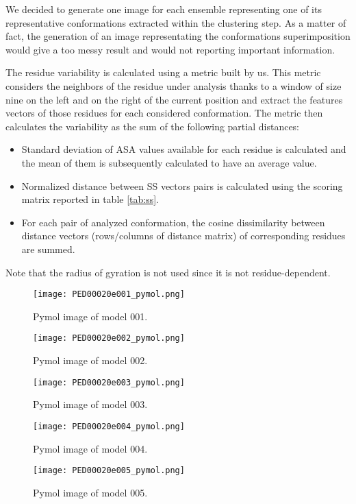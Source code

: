 We decided to generate one image for each ensemble representing one of its representative conformations extracted within the clustering step.
As a matter of fact, the generation of an image representating the conformations superimposition would give a too messy result and would not reporting important information.

\medskip
The residue variability is calculated using a metric built by us. 
This metric considers the neighbors of the residue under analysis thanks to a window of size nine on the left and on the right of the current position and extract the features vectors of those residues for each considered conformation. The metric then calculates the variability as the sum of the following partial distances:
\begin{itemize}
\item Standard deviation of ASA values available for each residue is calculated and the mean of them is subsequently calculated to have an average value.
\item Normalized distance between SS vectors pairs is calculated using the scoring matrix reported in table \ref{tab:ss}.
\item For each pair of analyzed conformation, the cosine dissimilarity between distance vectors (rows/columns of distance matrix) of corresponding residues are summed.
\end{itemize}
Note that the radius of gyration is not used since it is not residue-dependent.

\begin{figure}[H]
	\begin{minipage}[b]{0.97\textwidth}
		\centering
		\texttt{[image: PED00020e001\_pymol.png]}
		\caption{Pymol image of model 001.}
		\label{model001p}
	\end{minipage}
	\begin{minipage}[b]{0.97\textwidth}
		\centering
		\texttt{[image: PED00020e002\_pymol.png]}
		\caption{Pymol image of model 002.}
		\label{model002p}
	\end{minipage}
\end{figure}
\begin{figure}[H]
	\begin{minipage}[b]{0.99\textwidth}
		\centering
		\texttt{[image: PED00020e003\_pymol.png]}
		\caption{Pymol image of model 003.}
		\label{model003p}
	\end{minipage}
	\begin{minipage}[b]{0.99\textwidth}
		\centering
		\texttt{[image: PED00020e004\_pymol.png]}
		\caption{Pymol image of model 004.}
		\label{model004p}
	\end{minipage}
	\begin{minipage}[b]{0.99\textwidth}
		\centering
		\texttt{[image: PED00020e005\_pymol.png]}
		\caption{Pymol image of model 005.}
		\label{model005p}
	\end{minipage}
\end{figure}

